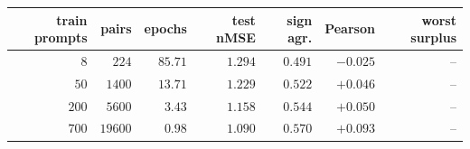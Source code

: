 \begin{tabular}{rrrrrrr}
\toprule
train prompts & pairs & epochs & test nMSE & sign agr. & Pearson & worst surplus\\
\midrule
$8$ & $224$ & $85.71$ & $1.294$ & $0.491$ & $-0.025$ & --\\
$50$ & $1400$ & $13.71$ & $1.229$ & $0.522$ & $+0.046$ & --\\
$200$ & $5600$ & $3.43$ & $1.158$ & $0.544$ & $+0.050$ & --\\
$700$ & $19600$ & $0.98$ & $1.090$ & $0.570$ & $+0.093$ & --\\
\bottomrule
\end{tabular}
